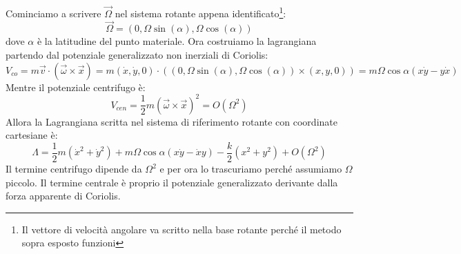 \documentclass[a4paper,openany]{article}
\begin{document}
	Cominciamo a scrivere $\vec{\Omega}$ nel sistema rotante appena identificato\footnote{Il vettore di velocità angolare va scritto nella base rotante perché il metodo sopra esposto funzioni}:
	$$
	\vec{\Omega} = (0,\Omega \sin(\alpha), \Omega \cos(\alpha))
	$$
	dove $\alpha$ è la latitudine del punto materiale. Ora costruiamo la lagrangiana partendo dal potenziale generalizzato non inerziali di Coriolis:
	$$
	V_{co} = m\vec{v}\cdot(\vec{\omega}\times\vec{x}) = m(\dot{x},\dot{y},0) \cdot ((0,\Omega \sin(\alpha), \Omega \cos(\alpha))\times(x,y,0)) = m\Omega\cos\alpha(x\dot{y}-y\dot{x})
	$$
	Mentre il potenziale centrifugo è:
	$$
	V_{cen} = \dfrac{1}{2}m(\vec{\omega}\times\vec{x})^2 = O(\Omega^2)
	$$
	Allora la Lagrangiana scritta nel sistema di riferimento rotante con coordinate cartesiane è:
	\begin{equation}
		\Lambda = \dfrac{1}{2}m(\dot{x}^{2}+\dot{y}^{2}) + m\Omega \cos\alpha (x\dot{y}-\dot{x}y) - \dfrac{k}{2}(x^2+y^2) + O(\Omega^2)
	\end{equation}
	Il termine centrifugo dipende da $\Omega^2$ e per ora lo trascuriamo perché assumiamo $\Omega$ piccolo. Il termine centrale è proprio il potenziale generalizzato derivante dalla forza apparente di Coriolis. 
	
\end{document}
